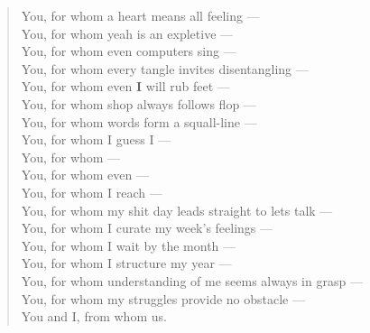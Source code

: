 \begin{verse}
  You, for whom a heart means all feeling ---\\
  You, for whom yeah is an expletive ---\\
  You, for whom even computers sing ---\\
  You, for whom every tangle invites disentangling ---\\
  You, for whom even \textbf{I} will rub feet ---\\
  You, for whom shop always follows flop ---\\
  You, for whom words form a squall-line ---\\
  You, for whom I guess I ---\\
  You, for whom ---\\
  You, for whom even ---\\
  You, for whom I reach ---\\
  You, for whom my shit day leads straight to lets talk ---\\
  You, for whom I curate my week's feelings ---\\
  You, for whom I wait by the month ---\\
  You, for whom I structure my year ---\\
  You, for whom understanding of me seems always in grasp ---\\
  You, for whom my struggles provide no obstacle ---\\
  You and I, from whom us.
\end{verse}
